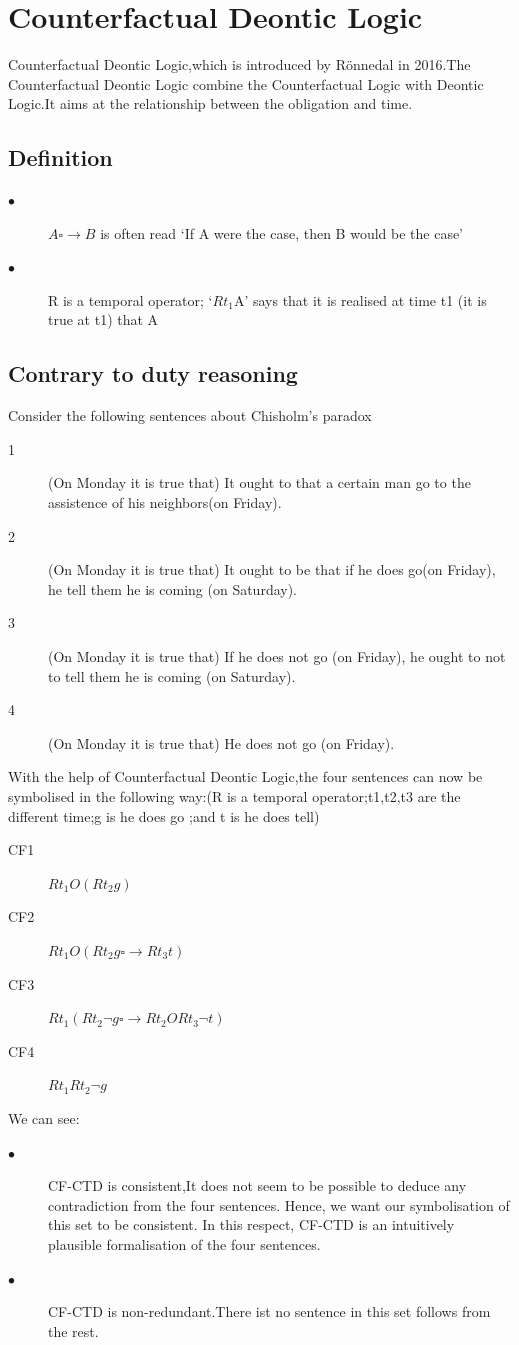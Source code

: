 \documentclass{article}
\begin{document}
\section{Counterfactual Deontic Logic}
  Counterfactual Deontic Logic\cite{6},which is introduced by Rönnedal in 2016.The Counterfactual Deontic Logic combine the Counterfactual Logic with Deontic Logic.It aims at the relationship between the obligation and time.
\subsection{Definition}
\begin{description}
\item[$\bullet$]$A\square \rightarrow B$ is often read ‘If A were the case, then B would be the case’
\item[$\bullet$]R is a temporal operator; ‘$Rt_{1}$A’ says that it is realised at time t1 (it is true at t1) that A
\end{description}
\subsection{ Contrary to duty reasoning}
Consider the following sentences about Chisholm's paradox
\begin{description}
\item[1] (On Monday it is true that) It ought to that a certain man go to the assistence of  his neighbors(on Friday).
\item[2] (On Monday it is true that) It ought to be that if he does go(on Friday), he tell them he is coming (on Saturday).
\item[3](On Monday it is true that) If he does not go (on Friday), he ought to not to tell them he is coming (on Saturday).
\item[4](On Monday it is true that) He does not go (on Friday).
\end{description}
With the help of Counterfactual Deontic Logic,the four sentences can now be symbolised in the following way:(R is a temporal operator;t1,t2,t3 are the different time;g is he does go ;and t is he does tell)
\begin{description}
\item[CF1]$Rt_{1}O(Rt_{2}g)$
\item[CF2]$Rt_{1}O(Rt_{2}g \square \rightarrow Rt_{3}t)$
\item[CF3]$Rt_{1}(Rt_{2}\neg g \square \rightarrow Rt_{2}ORt_{3}\neg t)$
\item[CF4]$Rt_{1}Rt_{2}\neg g$
\end{description}
We can see:
\begin{description}
\item[$\bullet$] CF-CTD is consistent,It does not seem to be possible to deduce any contradiction from the four sentences. Hence, we want our symbolisation of this set to be consistent. In this respect, CF-CTD is an intuitively plausible formalisation of the four sentences.
\item[$\bullet$] CF-CTD is non-redundant.There ist no sentence in this set follows from the rest.
\end{description}
\end{document}
